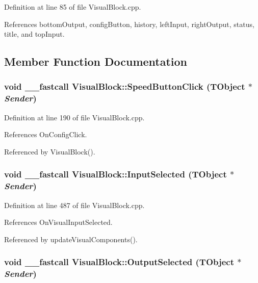 Definition at line 85 of file VisualBlock.cpp.

References bottomOutput, configButton, history, leftInput, rightOutput, status, title, and topInput.

\subsection{Member Function Documentation}
\hypertarget{classVisualBlock_12b120084c71ac8e29f8b527401e9bb6}{
\subsubsection[SpeedButtonClick]{\setlength{\rightskip}{0pt plus 5cm}void \_\-\_\-fastcall VisualBlock::SpeedButtonClick (TObject $\ast$ {\em Sender})}}
\label{classVisualBlock_12b120084c71ac8e29f8b527401e9bb6}




Definition at line 190 of file VisualBlock.cpp.

References OnConfigClick.

Referenced by VisualBlock().\hypertarget{classVisualBlock_a6eb1b3dcbbbb50d21bfb263935c6780}{
\subsubsection[InputSelected]{\setlength{\rightskip}{0pt plus 5cm}void \_\-\_\-fastcall VisualBlock::InputSelected (TObject $\ast$ {\em Sender})}}
\label{classVisualBlock_a6eb1b3dcbbbb50d21bfb263935c6780}




Definition at line 487 of file VisualBlock.cpp.

References OnVisualInputSelected.

Referenced by updateVisualComponents().\hypertarget{classVisualBlock_79906715a0a58e622284b4be0402d13d}{
\subsubsection[OutputSelected]{\setlength{\rightskip}{0pt plus 5cm}void \_\-\_\-fastcall VisualBlock::OutputSelected (TObject $\ast$ {\em Sender})}}
\label{classVisualBlock_79906715a0a58e622284b4be0402d13d}




